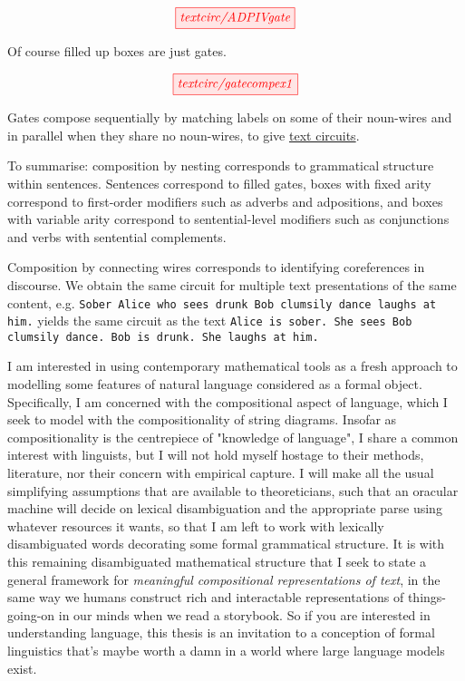 \begin{marginfigure}
\centering
\[
\tikzfig{textcirc/ADPIVgate}
\]
\caption{Of course filled up boxes are just gates.}
\end{marginfigure}

\begin{marginfigure}
\centering
\[
\tikzfig{textcirc/gatecompex1}  
\]
\caption{Gates compose sequentially by matching labels on some of their noun-wires and in parallel when they share no noun-wires, to give \underline{text circuits}.}
\end{marginfigure}

\begin{marginfigure}
\centering
{}
\caption{To summarise: composition by nesting corresponds to grammatical structure within sentences. Sentences correspond to filled gates, boxes with fixed arity correspond to first-order modifiers such as adverbs and adpositions, and boxes with variable arity correspond to sentential-level modifiers such as conjunctions and verbs with sentential complements.}
\end{marginfigure}

\begin{marginfigure}
\centering
{}
\caption{Composition by connecting wires corresponds to identifying coreferences in discourse. We obtain the same circuit for multiple text presentations of the same content, e.g. \texttt{Sober Alice who sees drunk Bob clumsily dance laughs at him.} yields the same circuit as the text \texttt{Alice is sober. She sees Bob clumsily dance. Bob is drunk. She laughs at him.}}
\end{marginfigure}


I am interested in using contemporary mathematical tools as a fresh approach to modelling some features of natural language considered as a formal object. Specifically, I am concerned with the compositional aspect of language, which I seek to model with the compositionality of string diagrams. Insofar as compositionality is the centrepiece of "knowledge of language", I share a common interest with linguists, but I will not hold myself hostage to their methods, literature, nor their concern with empirical capture. I will make all the usual simplifying assumptions that are available to theoreticians, such that an oracular machine will decide on lexical disambiguation and the appropriate parse using whatever resources it wants, so that I am left to work with lexically disambiguated words decorating some formal grammatical structure. It is with this remaining disambiguated mathematical structure that I seek to state a general framework for \emph{meaningful compositional representations of text}, in the same way we humans construct rich and interactable representations of things-going-on in our minds when we read a storybook. So if you are interested in understanding language, this thesis is an invitation to a conception of formal linguistics that's maybe worth a damn in a world where large language models exist.

